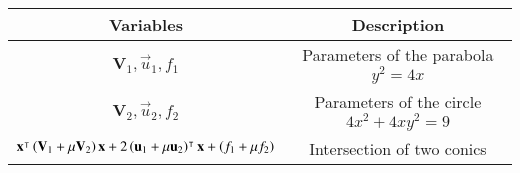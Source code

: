 \begin{tabular}[12pt]{ |c| c|}
    \hline
    \textbf{Variables} & \textbf{Description}\\ 
    \hline
    $\textbf{V}_1, \vec{u}_1, f_1$ & Parameters of the parabola $y^2 = 4x$ \\
    \hline
     $\textbf{V}_2, \vec{u}_2, f_2$ & Parameters of the circle $4x^2 + 4xy^2 = 9$ \\
    \hline
    $\mathbf{x}^\intercal\left(\textbf{V}_1 + \mu\textbf{V}_2\right)\mathbf{x} + 2\left(\mathbf{u}_1 + \mu\mathbf{u}_2\right)^\intercal\mathbf{x} + \left(f_1 + \mu f_2\right)$ & Intersection of two conics \\
    \hline
    \end{tabular}

